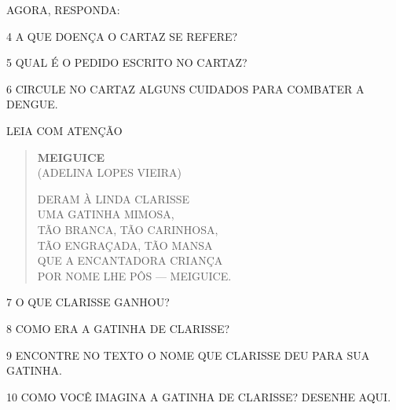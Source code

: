 AGORA, RESPONDA:

\num{4} A QUE DOENÇA O CARTAZ SE REFERE?


\num{5} QUAL É O PEDIDO ESCRITO NO CARTAZ?


\num{6} CIRCULE NO CARTAZ ALGUNS CUIDADOS PARA COMBATER A DENGUE.


\pagebreak
LEIA COM ATENÇÃO

\begin{minipage}{.7\textwidth}
\begin{verse}
\textbf{MEIGUICE}\\
(ADELINA LOPES VIEIRA)

DERAM À LINDA CLARISSE\\
UMA GATINHA MIMOSA,\\
TÃO BRANCA, TÃO CARINHOSA,\\
TÃO ENGRAÇADA, TÃO MANSA\\
QUE A ENCANTADORA CRIANÇA\\
POR NOME LHE PÔS --- MEIGUICE.
\end{verse}
\end{minipage}
\begin{minipage}{.3\textwidth}
\end{minipage}

\num{7} O QUE CLARISSE GANHOU?


\num{8} COMO ERA A GATINHA DE CLARISSE?


\num{9} ENCONTRE NO TEXTO O NOME QUE CLARISSE DEU PARA SUA GATINHA.


\num{10} COMO VOCÊ IMAGINA A GATINHA DE CLARISSE? DESENHE AQUI.

\begin{mdframed}[linewidth=2pt,linecolor=salmao,roundcorner=2pt]
\vspace{3cm}
\end{mdframed}

